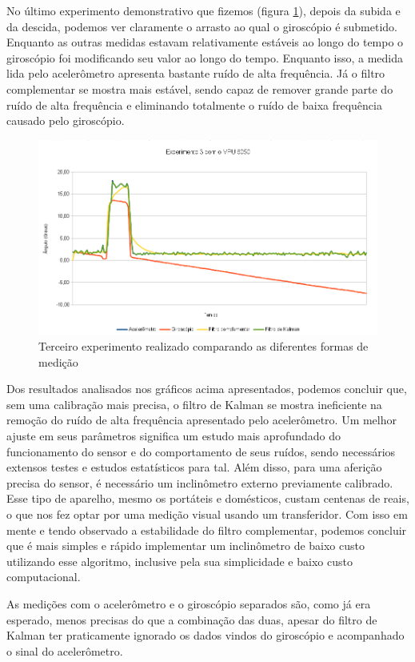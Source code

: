 \documentclass[a4paper,12pt]{article}
\begin{document}
No último experimento demonstrativo que fizemos (figura \ref{exp3}), depois da subida e da descida, podemos ver claramente o arrasto ao qual o giroscópio é submetido. Enquanto as outras medidas estavam relativamente estáveis ao longo do tempo o giroscópio foi modificando seu valor ao longo do tempo. Enquanto isso, a medida lida pelo acelerômetro apresenta bastante ruído de alta frequência. Já o filtro complementar se mostra mais estável, sendo capaz de remover grande parte do ruído de alta frequência e eliminando totalmente o ruído de baixa frequência causado pelo giroscópio. 

\begin{figure}[H]
\centering
\includegraphics[width=.8\textwidth]{img/exp3.png}
\caption{Terceiro experimento realizado comparando as diferentes formas de medição}
\label{exp3}
\end{figure}

Dos resultados analisados nos gráficos acima apresentados, podemos concluir que, sem uma calibração mais precisa, o filtro de Kalman se mostra ineficiente na remoção do ruído de alta frequência apresentado pelo acelerômetro. Um melhor ajuste em seus parâmetros significa um estudo mais aprofundado do funcionamento do sensor e do comportamento de seus ruídos, sendo necessários extensos testes e estudos estatísticos para tal. Além disso, para uma aferição precisa do sensor, é necessário um inclinômetro externo previamente calibrado. Esse tipo de aparelho, mesmo os portáteis e domésticos, custam centenas de reais, o que nos fez optar por uma medição visual usando um transferidor. Com isso em mente e tendo observado a estabilidade do filtro complementar, podemos concluir que é mais simples e rápido implementar um inclinômetro de baixo custo utilizando esse algoritmo, inclusive pela sua simplicidade e baixo custo computacional.

As medições com o acelerômetro e o giroscópio separados são, como já era esperado, menos precisas do que a combinação das duas, apesar do filtro de Kalman ter praticamente ignorado os dados vindos do giroscópio e acompanhado o sinal do acelerômetro.
\end{document}
